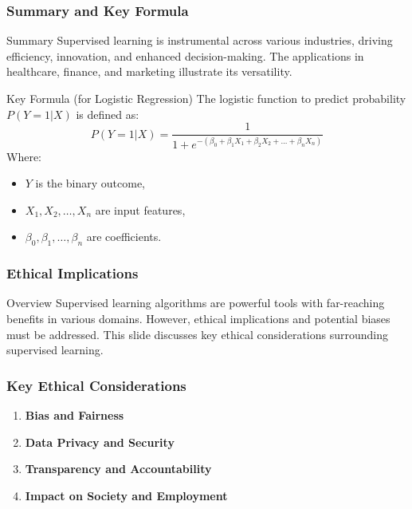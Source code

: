 \documentclass[aspectratio=169]{beamer}
\begin{document}
\begin{frame}[fragile]
    \frametitle{Summary and Key Formula}
    \begin{block}{Summary}
        Supervised learning is instrumental across various industries, driving efficiency, innovation, and enhanced decision-making. The applications in healthcare, finance, and marketing illustrate its versatility.
    \end{block}
    
    \begin{block}{Key Formula (for Logistic Regression)}
        The logistic function to predict probability \( P(Y=1|X) \) is defined as:
        \begin{equation}
        P(Y=1|X) = \frac{1}{1 + e^{-(\beta_0 + \beta_1X_1 + \beta_2X_2 + ... + \beta_nX_n)}}
        \end{equation}
        Where:
        \begin{itemize}
            \item \(Y\) is the binary outcome,
            \item \(X_1, X_2,\ldots,X_n\) are input features,
            \item \(\beta_0, \beta_1, \ldots, \beta_n\) are coefficients.
        \end{itemize}
    \end{block}
\end{frame}

\begin{frame}[fragile]
    \frametitle{Ethical Implications}
    \begin{block}{Overview}
        Supervised learning algorithms are powerful tools with far-reaching benefits in various domains. However, ethical implications and potential biases must be addressed. This slide discusses key ethical considerations surrounding supervised learning.
    \end{block}
\end{frame}

\begin{frame}[fragile]
    \frametitle{Key Ethical Considerations}
    \begin{enumerate}
        \item \textbf{Bias and Fairness}
        \item \textbf{Data Privacy and Security}
        \item \textbf{Transparency and Accountability}
        \item \textbf{Impact on Society and Employment}
    \end{enumerate}
\end{frame}
\end{document}
